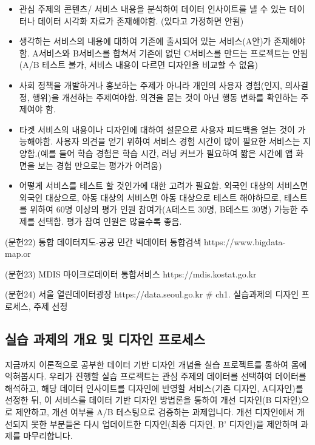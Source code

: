 \documentclass[
  letterpaper,
]{book}
\providecommand{\tightlist}{%
  \setlength{\itemsep}{0pt}\setlength{\parskip}{0pt}}\usepackage{longtable,booktabs,array}
\begin{document}
\begin{itemize}
\tightlist
\item
  관심 주제의 콘텐츠/ 서비스 내용을 분석하여 데이터 인사이트를 낼 수
  있는 데이터나 데이터 시각화 자료가 존재해야함. (있다고 가정하면 안됨)
\item
  생각하는 서비스의 내용에 대하여 기존에 출시되어 있는 서비스(A안)가
  존재해야함. A서비스와 B서비스를 합쳐서 기존에 없던 C서비스를 만드는
  프로젝트는 안됨 (A/B 테스트 불가, 서비스 내용이 다르면 디자인을 비교할
  수 없음)
\item
  사회 정책을 개발하거나 홍보하는 주제가 아니라 개인의 사용자 경험(인지,
  의사결정, 행위)을 개선하는 주제여야함. 의견을 묻는 것이 아닌 행동
  변화를 확인하는 주제여야 함.
\item
  타겟 서비스의 내용이나 디자인에 대하여 설문으로 사용자 피드백을 얻는
  것이 가능해야함. 사용자 의견을 얻기 위하여 서비스 경험 시간이 많이
  필요한 서비스는 지양함.(예를 들어 학습 경험은 학습 시간, 러닝 커브가
  필요하여 짧은 시간에 앱 화면을 보는 경험 만으로는 평가가 어려움)
\item
  어떻게 서비스를 테스트 할 것인가에 대한 고려가 필요함. 외국인 대상의
  서비스면 외국인 대상으로, 아동 대상의 서비스면 아동 대상으로 테스트
  해야하므로, 테스트를 위하여 60명 이상의 평가 인원 참여가(A테스트 30명,
  B테스트 30명) 가능한 주제를 선택함. 평가 참여 인원은 많을수록 좋음.
\end{itemize}

(문헌22) 통합 데이터지도-공공 민간 빅데이터 통합검색
https://www.bigdata-map.or

(문헌23) MDIS 마이크로데이터 통합서비스 https://mdis.kostat.go.kr

(문헌24) 서울 열린데이터광장 https://data.seoul.go.kr \# ch1. 실습과제의
디자인 프로세스, 주제 선정

\subsection{실습 과제의 개요 및 디자인
프로세스}\label{uxc2e4uxc2b5-uxacfcuxc81cuxc758-uxac1cuxc694-uxbc0f-uxb514uxc790uxc778-uxd504uxb85cuxc138uxc2a4-1}

지금까지 이론적으로 공부한 데이터 기반 디자인 개념을 실습 프로젝트를
통하여 몸에 익혀봅시다. 우리가 진행할 실습 프로젝트는 관심 주제의
데이터를 선택하여 데이터를 해석하고, 해당 데이터 인사이트를 디자인에
반영할 서비스(기존 디자인, A디자인)를 선정한 뒤, 이 서비스를 데이터 기반
디자인 방법론을 통하여 개선 디자인(B 디자인)으로 제안하고, 개선 여부를
A/B 테스팅으로 검증하는 과제입니다. 개선 디자인에서 개선되지 못한
부분들은 다시 업데이트한 디자인(최종 디자인, B' 디자인)을 제안하며
과제를 마무리합니다.
\end{document}
